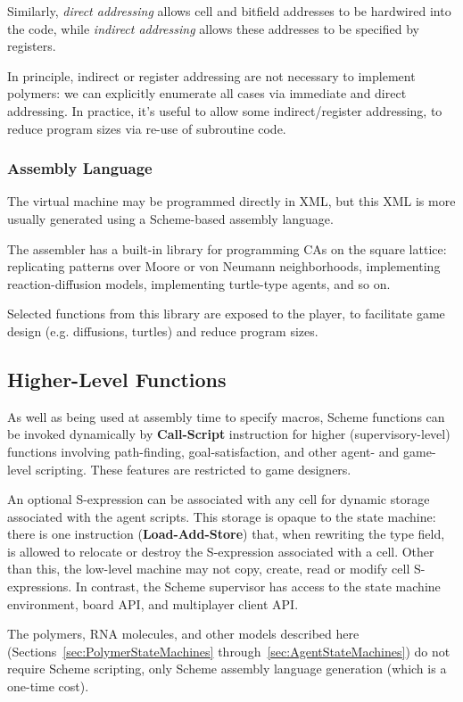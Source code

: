\documentclass{acm_proc_article-sp}
\begin{document}
Similarly, {\em direct addressing} allows cell and bitfield addresses to be hardwired into the code,
while {\em indirect addressing} allows these addresses to be specified by registers.

In principle, indirect or register addressing are not necessary to implement polymers:
we can explicitly enumerate all cases via immediate and direct addressing.
In practice, it's useful to allow some indirect/register addressing, to reduce program sizes via re-use of subroutine code.

\subsubsection{Assembly Language}

The virtual machine may be programmed directly in XML, but this XML is more usually generated using
a Scheme-based assembly language.

The assembler has a built-in library for programming CAs on the square lattice:
replicating patterns over Moore or von Neumann neighborhoods,
implementing reaction-diffusion models, implementing turtle-type agents, and so on.

Selected functions from this library are exposed to the player,
to facilitate game design (e.g. diffusions, turtles) and reduce program sizes.

\subsection{Higher-Level Functions}

As well as being used at assembly time to specify macros,
Scheme functions can be invoked dynamically by {\bf Call-Script} instruction
for higher (supervisory-level) functions involving path-finding, goal-satisfaction, and other agent- and game-level scripting.
These features are restricted to game designers.

An optional S-expression can be associated with any cell for dynamic storage associated with the agent scripts.
This storage is opaque to the state machine: there is one instruction ({\bf Load-Add-Store}) that, when rewriting the type field, is allowed to relocate or destroy the S-expression associated with a cell.
Other than this, the low-level machine may not copy, create, read or modify cell S-expressions.
In contrast, the Scheme supervisor has access to the state machine environment, board API, and multiplayer client API.

The polymers, RNA molecules, and other models described here
 (Sections~\ref{sec:PolymerStateMachines} through~\ref{sec:AgentStateMachines})
 do not require Scheme scripting, only Scheme assembly language generation (which is a one-time cost).
\end{document}
